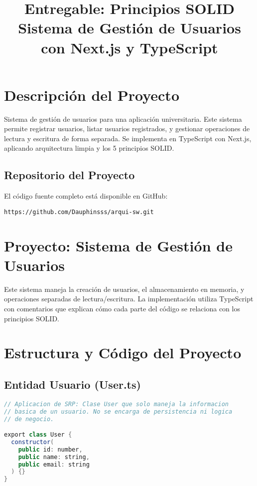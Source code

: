 \documentclass[11pt,a4paper]{article}
\begin{document}
\title{\textbf{Entregable: Principios SOLID}\\
\large Sistema de Gestión de Usuarios con Next.js y TypeScript}
\author{}
\date{}
\maketitle

\section*{Descripción del Proyecto}

Sistema de gestión de usuarios para una aplicación universitaria. Este sistema permite registrar usuarios, listar usuarios registrados, y gestionar operaciones de lectura y escritura de forma separada. Se implementa en TypeScript con Next.js, aplicando arquitectura limpia y los 5 principios SOLID.

\subsection*{Repositorio del Proyecto}
El código fuente completo está disponible en GitHub:

\texttt{https://github.com/Dauphinsss/arqui-sw.git}

\section{Proyecto: Sistema de Gestión de Usuarios}

Este sistema maneja la creación de usuarios, el almacenamiento en memoria, y operaciones separadas de lectura/escritura. La implementación utiliza TypeScript con comentarios que explican cómo cada parte del código se relaciona con los principios SOLID.

\section{Estructura y Código del Proyecto}

\subsection*{Entidad Usuario (User.ts)}

\begin{lstlisting}[language=Java]
// Aplicacion de SRP: Clase User que solo maneja la informacion
// basica de un usuario. No se encarga de persistencia ni logica
// de negocio.

export class User {
  constructor(
    public id: number,
    public name: string,
    public email: string
  ) {}
}
\end{lstlisting}
\end{document}
